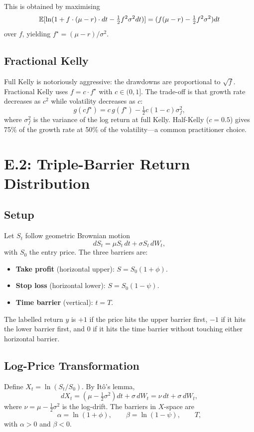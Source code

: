 This is obtained by maximising
\[
\mathbb{E}[\ln(1 + f \cdot (\mu - r) \cdot dt - \tfrac{1}{2} f^2 \sigma^2 dt)] = (f(\mu - r) - \tfrac{1}{2} f^2 \sigma^2) dt
\]
over $f$, yielding $f^\star = (\mu - r)/\sigma^2$.

\subsection{Fractional Kelly}

Full Kelly is notoriously aggressive: the drawdowns are proportional
to $\sqrt{f}$. Fractional Kelly uses $f = c \cdot f^\star$ with $c \in
(0, 1]$. The trade-off is that growth rate decreases as $c^2$ while
volatility decreases as $c$:
\[
g(c f^\star) = c \, g(f^\star) - \tfrac{1}{2} c (1 - c) \sigma_f^2,
\]
where $\sigma_f^2$ is the variance of the log return at full Kelly.
Half-Kelly ($c = 0.5$) gives 75\% of the growth rate at 50\% of the
volatility---a common practitioner choice.

\section{E.2: Triple-Barrier Return Distribution}

\subsection{Setup}

Let $S_t$ follow geometric Brownian motion
\[
dS_t = \mu S_t \, dt + \sigma S_t \, dW_t,
\]
with $S_0$ the entry price. The three barriers are:
\begin{itemize}
    \item \textbf{Take profit} (horizontal upper): $S = S_0 (1 + \phi)$.
    \item \textbf{Stop loss} (horizontal lower): $S = S_0 (1 - \psi)$.
    \item \textbf{Time barrier} (vertical): $t = T$.
\end{itemize}

The labelled return $y$ is $+1$ if the price hits the upper barrier
first, $-1$ if it hits the lower barrier first, and $0$ if it hits the
time barrier without touching either horizontal barrier.

\subsection{Log-Price Transformation}

Define $X_t = \ln(S_t / S_0)$. By It\^o's lemma,
\[
dX_t = \left(\mu - \tfrac{1}{2} \sigma^2\right) dt + \sigma \, dW_t = \nu \, dt + \sigma \, dW_t,
\]
where $\nu = \mu - \tfrac{1}{2} \sigma^2$ is the log-drift. The
barriers in $X$-space are
\[
\alpha = \ln(1 + \phi), \qquad \beta = \ln(1 - \psi), \qquad T,
\]
with $\alpha > 0$ and $\beta < 0$.

